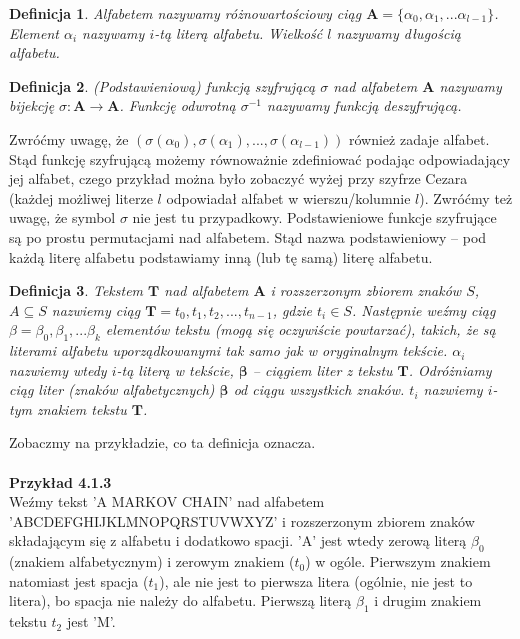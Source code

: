\documentclass[a4paper]{article}
\theoremstyle{defn}
\newtheorem{defn}{Definicja}[subsection]
\theoremstyle{theorem}
\theoremstyle{lemma}
\theoremstyle{cor}
\theoremstyle{fact}
\begin{document}
\begin{defn}\label{defn4.1.1}
\textit{Alfabetem} nazywamy różnowartościowy ciąg $\boldsymbol{A} = \{\alpha_0, \alpha_1, ... \alpha_{l-1}\}$. Element $\alpha_i$ nazywamy $i$-tą \textit{literą} alfabetu. Wielkość $l$ nazywamy długością alfabetu.
\end{defn}
\begin{defn}\label{defn4.1.2}
\textit{(Podstawieniową) funkcją szyfrującą} $\sigma$ nad alfabetem $\boldsymbol{A}$ nazywamy bijekcję $\sigma: \boldsymbol{A} \to \boldsymbol{A}$. Funkcję odwrotną $\sigma^{-1}$ nazywamy \textit{funkcją deszyfrującą}.
\end{defn}
Zwróćmy uwagę, że $(\sigma(\alpha_0), \sigma(\alpha_1),...,\sigma(\alpha_{l-1}))$ również zadaje alfabet. Stąd funkcję szyfrującą możemy równoważnie zdefiniować podając odpowiadający jej alfabet, czego przykład można było zobaczyć wyżej przy szyfrze Cezara (każdej możliwej literze $l$ odpowiadał alfabet w wierszu/kolumnie $l$). Zwróćmy też uwagę, że symbol $\sigma$ nie jest tu przypadkowy. Podstawieniowe funkcje szyfrujące są po prostu permutacjami nad alfabetem. Stąd nazwa podstawieniowy – pod każdą literę alfabetu podstawiamy inną (lub tę samą) literę alfabetu.
\begin{defn}\label{defn4.1.3}
\textit{Tekstem} $\boldsymbol{T}$ nad alfabetem $\boldsymbol{A}$ i rozszerzonym zbiorem znaków $S$, $A \subseteq S$ nazwiemy ciąg $\boldsymbol{T} = t_0, t_1, t_2, ..., t_{n-1}$, gdzie $t_i \in S$. Następnie weźmy ciąg $\beta = \beta_0, \beta_1, ... \beta_k$ elementów tekstu (mogą się oczywiście powtarzać), takich, że są literami alfabetu uporządkowanymi tak samo jak w oryginalnym tekście. $\alpha_i$ nazwiemy wtedy $i$-tą literą w tekście, $\boldsymbol{\beta}$ – ciągiem liter z tekstu $\boldsymbol{T}$. Odróżniamy ciąg liter (znaków alfabetycznych) $\boldsymbol{\beta}$ od ciągu wszystkich znaków. $t_i$ nazwiemy $i$-tym znakiem tekstu $\boldsymbol{T}$.
\end{defn}
Zobaczmy na przykładzie, co ta definicja oznacza. \\\\
\textbf{Przykład 4.1.3}\\ Weźmy tekst 'A MARKOV CHAIN' nad alfabetem 'ABCDEFGHIJKLMNOPQRSTUVWXYZ' i rozszerzonym zbiorem znaków składającym się z alfabetu i dodatkowo spacji. 'A' jest wtedy zerową literą $\beta_0$ (znakiem alfabetycznym) i zerowym znakiem ($t_0$) w ogóle. Pierwszym znakiem natomiast jest spacja ($t_1$), ale nie jest to pierwsza litera (ogólnie, nie jest to litera), bo spacja nie należy do alfabetu. Pierwszą literą $\beta_1$ i drugim znakiem tekstu $t_2$ jest 'M'.\\
\end{document}
